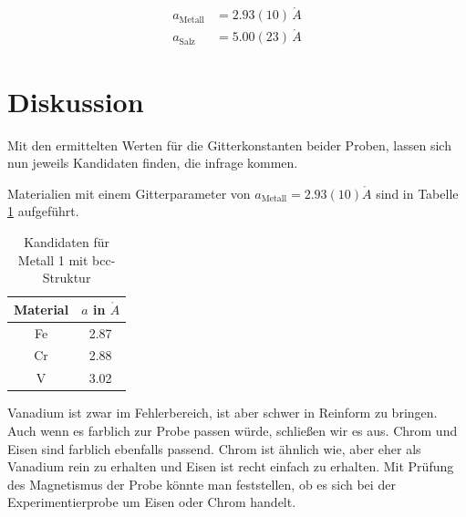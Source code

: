 \begin{align}
 a_\text{Metall} &= 2.93(10)\, \mathring{A} \\
 \nonumber
 a_\text{Salz} &= 5.00(23)\, \mathring{A} 
 \label{eq:latticeResults}
\end{align}

\noindent
\section{Diskussion}
Mit den ermittelten Werten für die Gitterkonstanten beider Proben, lassen sich nun jeweils Kandidaten finden, die infrage kommen.

\noindent Materialien mit einem Gitterparameter von $a_\text{Metall} = 2.93(10) \mathring{A}$ sind in Tabelle \ref{tab:matProb1} %
aufgeführt.

\begin{table}[H]
 \begin{tabular}{cc}
Material &$a$ in $\mathring{A}$\\
\hline
Fe&2.87\\ 
Cr& 2.88\\ 
V & 3.02\\  
 \end{tabular}
 \caption{Kandidaten für Metall 1 mit bcc-Struktur \cite{Gitterparameter}\cite{metall}}
 \label{tab:matProb1}
\end{table}
\noindent  Vanadium ist zwar im Fehlerbereich, ist aber schwer in Reinform zu bringen. Auch wenn es farblich zur Probe passen würde, schließen wir
es aus. Chrom und Eisen sind farblich ebenfalls passend. Chrom ist ähnlich wie, aber eher als Vanadium rein zu erhalten und Eisen ist recht einfach
zu erhalten. Mit Prüfung des Magnetismus der Probe könnte man feststellen, ob es sich bei der Experimentierprobe um Eisen oder Chrom handelt.

